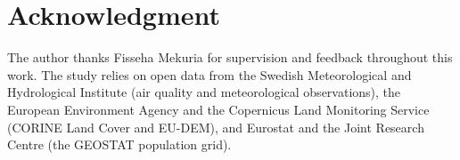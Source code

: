 \documentclass[conference]{IEEEtran}
\begin{document}
\section*{Acknowledgment}

The author thanks Fisseha Mekuria for supervision and feedback throughout this
work. The study relies on open data from the Swedish Meteorological and
Hydrological Institute (air quality and meteorological observations), the
European Environment Agency and the Copernicus Land Monitoring Service (CORINE
Land Cover and EU-DEM), and Eurostat and the Joint Research Centre (the
GEOSTAT population grid).



\end{document}
